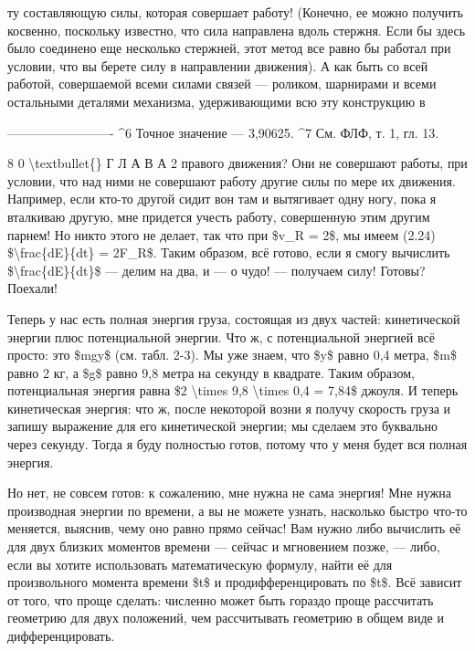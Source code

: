 \documentclass[10pt,oneside]{article}
\begin{document}
ту составляющую силы, которая совершает работу! (Конечно, ее можно получить косвенно, поскольку известно, что сила направлена вдоль стержня. Если бы здесь было соединено еще несколько стержней, этот метод все равно бы работал при условии, что вы берете силу в направлении движения). А как быть со всей работой, совершаемой всеми силами связей --- роликом, шарнирами и всеми остальными деталями механизма, удерживающими всю эту конструкцию в\par

------------------------- \textasciicircum{}6 Точное значение --- 3,90625. \textasciicircum{}7 См. ФЛФ, т. 1, гл. 13.\par

8 0 \textbackslash{}textbullet\{\} Г Л А В А  2 правого движения? Они не совершают работы, при условии, что над ними не совершают работу другие силы по мере их движения. Например, если кто-то другой сидит вон там и вытягивает одну ногу, пока я вталкиваю другую, мне придется учесть работу, совершенную этим другим парнем! Но никто этого не делает, так что при \$v\_R = 2\$, мы имеем (2.24) \$\textbackslash{}frac\{dE\}\{dt\} = 2F\_R\$. Таким образом, всё готово, если я смогу вычислить \$\textbackslash{}frac\{dE\}\{dt\}\$ --- делим на два, и --- о чудо! --- получаем силу! Готовы? Поехали!\par

Теперь у нас есть полная энергия груза, состоящая из двух частей: кинетической энергии плюс потенциальной энергии. Что ж, с потенциальной энергией всё просто: это \$mgy\$ (см. табл. 2-3). Мы уже знаем, что \$y\$ равно 0,4 метра, \$m\$ равно 2 кг, а \$g\$ равно 9,8 метра на секунду в квадрате. Таким образом, потенциальная энергия равна \$2 \textbackslash{}times 9,8 \textbackslash{}times 0,4 = 7,84\$ джоуля. И теперь кинетическая энергия: что ж, после некоторой возни я получу скорость груза и запишу выражение для его кинетической энергии; мы сделаем это буквально через секунду. Тогда я буду полностью готов, потому что у меня будет вся полная энергия.\par

Но нет, не совсем готов: к сожалению, мне нужна не сама энергия! Мне нужна производная энергии по времени, а вы не можете узнать, насколько быстро что-то меняется, выяснив, чему оно равно прямо сейчас! Вам нужно либо вычислить её для двух близких моментов времени --- сейчас и мгновением позже, --- либо, если вы хотите использовать математическую формулу, найти её для произвольного момента времени \$t\$ и продифференцировать по \$t\$. Всё зависит от того, что проще сделать: численно может быть гораздо проще рассчитать геометрию для двух положений, чем рассчитывать геометрию в общем виде и дифференцировать.\par
\end{document}

